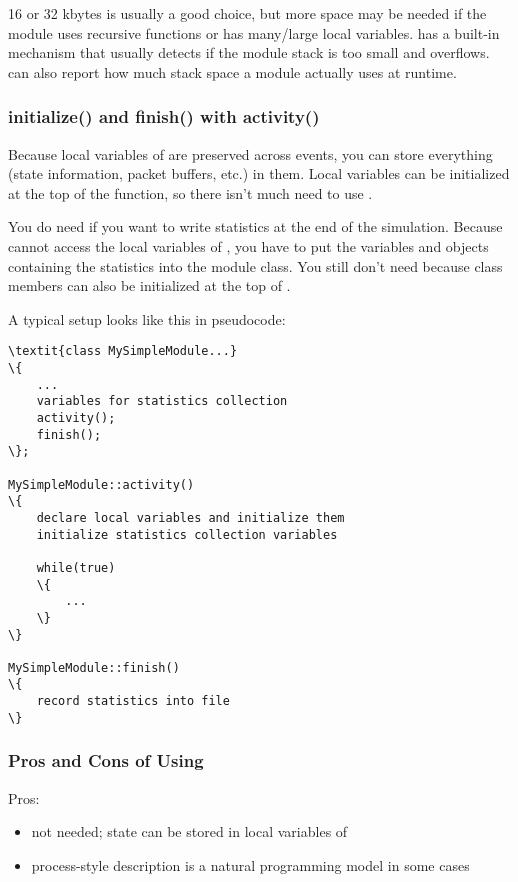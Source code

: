 16 or 32 kbytes is usually a good choice, but more space may be needed
if the module uses recursive functions or has many/large local variables.
{\opp} has a built-in mechanism that usually detects if the module stack
is too small and overflows. {\opp} can also report how
much stack space a module actually uses at runtime.


\subsubsection{initialize() and finish() with activity()}
\label{sec:simple-modules:activity:initialize-and-finish}

Because local variables of  are preserved across
events, you can store everything (state information, packet buffers,
etc.) in them. Local variables can be initialized at the top of the
 function, so there isn't much need to use
.

You do need  if you want to write statistics at
the end of the simulation. Because  cannot access
the local variables of , you have to put the variables
and objects containing the statistics into the module class.
You still don't need  because class members can also
be initialized at the top of .

A typical setup looks like this in pseudocode:

\begin{Verbatim}[commandchars=\\\{\}]
\textit{class MySimpleModule...}
\{
    ...
    variables for statistics collection
    activity();
    finish();
\};

MySimpleModule::activity()
\{
    declare local variables and initialize them
    initialize statistics collection variables

    while(true)
    \{
        ...
    \}
\}

MySimpleModule::finish()
\{
    record statistics into file
\}
\end{Verbatim}


\subsubsection{Pros and Cons of Using }
\label{sec:simple-modules:activity:pros-and-cons}

Pros:
\begin{itemize}
   \item {} not needed; state can be stored in local
       variables of 
   \item process-style description is a natural programming model in some cases
\end{itemize}

